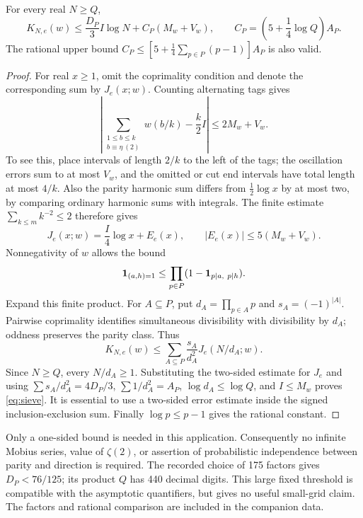 \begin{lemma}\label{lem:sieve}
For every real \(N\ge Q\),
\begin{equation}\label{eq:sieve}
 K_{N,e}(w)\le\frac{D_P}{3}I\log N+C_P(M_w+V_w),\qquad
 C_P=\left(5+\frac14\log Q\right)A_P.
\end{equation}
The rational upper bound
\(C_P\le[5+\tfrac14\sum_{p\in P}(p-1)]A_P\) is also valid.
\end{lemma}
\begin{proof}
For real \(x\ge1\), omit the coprimality condition and denote the
corresponding sum by \(J_e(x;w)\). Counting alternating tags gives
\[
 \left|\sum_{\substack{1\le b\le k\\b\equiv\eta\ (2)}}w(b/k)
       -\frac k2 I\right|\le2M_w+V_w.
\]
To see this, place intervals of length \(2/k\) to the left of the
tags; the oscillation errors sum to at most \(V_w\), and the omitted
or cut end intervals have total length at most \(4/k\).
Also the parity harmonic sum differs from \(\tfrac12\log x\)
by at most two, by comparing ordinary harmonic sums with integrals.
The finite estimate \(\sum_{k\le m}k^{-2}\le2\) therefore gives
\[
 J_e(x;w)=\frac I4\log x+E_e(x),\qquad
 |E_e(x)|\le5(M_w+V_w).
\]
Nonnegativity of \(w\) allows the bound
\[
 \mathbf 1_{(a,h)=1}\le
 \prod_{p\in P}(1-\mathbf 1_{p\mid a,\ p\mid h}).
\]
Expand this finite product. For \(A\subseteq P\), put
\(d_A=\prod_{p\in A}p\) and \(s_A=(-1)^{|A|}\).
Pairwise coprimality identifies simultaneous divisibility with
divisibility by \(d_A\); oddness preserves the parity class. Thus
\[
 K_{N,e}(w)\le\sum_{A\subseteq P}\frac{s_A}{d_A^2}J_e(N/d_A;w).
\]
Since \(N\ge Q\), every \(N/d_A\ge1\). Substituting the two-sided
estimate for \(J_e\) and using
\(\sum s_A/d_A^2=4D_P/3\), \(\sum1/d_A^2=A_P\),
\(\log d_A\le\log Q\), and \(I\le M_w\) proves
\eqref{eq:sieve}. It is essential to use a two-sided error estimate
inside the signed inclusion-exclusion sum. Finally \(\log p\le p-1\)
gives the rational constant.
\end{proof}

Only a one-sided bound is needed in this application. Consequently
no infinite Mobius series, value of \(\zeta(2)\), or assertion of
probabilistic independence between parity and direction is required.
The recorded choice of 175 factors gives \(D_P<76/125\); its product
\(Q\) has 440 decimal digits. This large fixed threshold is compatible
with the asymptotic quantifiers, but gives no useful small-grid claim.
The factors and rational comparison are included in the companion data.

